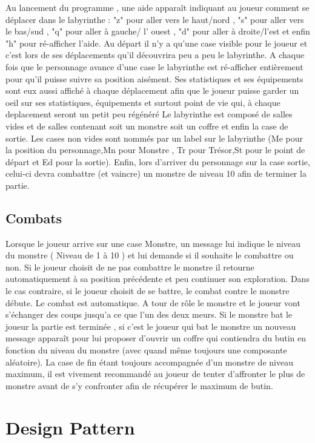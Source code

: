 \documentclass[a4paper]{article}
\begin{document}
 Au lancement du programme , une aide apparaît indiquant au joueur comment se déplacer dans le labyrinthe : "z" pour aller vers le haut/nord , "s" pour aller vers 
 le bas/sud , "q" pour aller à
 gauche/ l' ouest , "d" pour aller à droite/l'est et enfin "h" pour ré-afficher l'aide.
 Au départ il n'y a qu'une case visible pour le joueur et c'est lors de ses déplacements qu'il découvrira peu a peu le labyrinthe.
 A chaque fois que le personnage avance d'une case le labyrinthe est ré-afficher entièrement pour qu'il puisse suivre sa position aisément. Ses statistiques et
 ses équipements sont eux aussi affiché à chaque déplacement afin que le joueur puisse garder un oeil sur ses statistiques, équipements et surtout point de vie qui, à chaque
 deplacement seront un petit peu régénéré
 Le labyrinthe est composé de salles vides et de salles contenant soit un monstre soit un coffre et enfin la case de sortie.
 Les cases non vides sont nommés par un label sur le labyrinthe (Me pour la position du personnage,Mn pour Monstre , Tr pour Trésor,St pour le point de départ et Ed pour la sortie).
 Enfin, lors d'arriver du personnage sur la case sortie, celui-ci devra combattre (et vaincre) un monstre de niveau 10 afin de terminer la partie.
 
   \subsection{Combats}
   
  Lorsque le joueur arrive sur une case Monstre, un message lui indique le niveau du monstre ( Niveau de 1 à 10 ) et lui demande si il souhaite le
  combattre ou non. Si le joueur choisit de ne pas combattre le monstre il retourne automatiquement à sa position précédente et peu continuer son exploration.
  Dans le cas contraire, si le joueur choisit de se battre, le combat contre le monstre débute. Le combat est automatique. A tour de rôle le monstre
  et le joueur vont s'échanger des coups jusqu'a ce que l'un des deux meurs. Si le monstre bat le joueur la partie est terminée , si c'est le joueur qui 
  bat le monstre un nouveau message apparaît pour lui proposer d'ouvrir un coffre qui contiendra du butin en fonction du niveau du monstre (avec quand même toujours une composante aléatoire).
  La case de fin étant toujours accompagnée d'un monstre de niveau maximum, il est vivement recommandé au joueur de tenter d'affronter le plus de monstre avant de s'y confronter
  afin de récupérer le maximum de butin.
 
	\newpage
    \section{Design Pattern}
 
\end{document}

